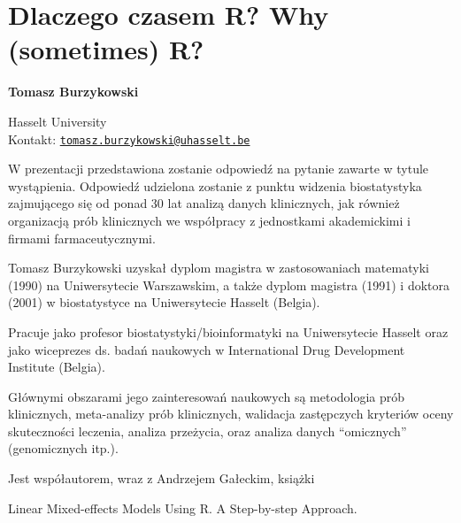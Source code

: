 \documentclass[\main/boa.tex]{subfiles}
\begin{document}
\section{Dlaczego czasem R? Why (sometimes) R?}


\begin{minipage}{0.915\textwidth}
	\centering
  {\bf \LARGE {} Tomasz Burzykowski}
\end{minipage}

\begin{affiliations}
\begin{minipage}{0.915\textwidth}
\centering
\large Hasselt University   \\[1pt]
Kontakt: \href{mailto:tomasz.burzykowski@uhasselt.be}{\nolinkurl{tomasz.burzykowski@uhasselt.be}}\\
\end{minipage}
\end{affiliations}


W prezentacji przedstawiona zostanie odpowiedź na pytanie zawarte w tytule wystąpienia. Odpowiedź udzielona zostanie z punktu widzenia biostatystyka zajmującego się od ponad 30 lat analizą danych klinicznych, jak również organizacją prób klinicznych we współpracy z jednostkami akademickimi i firmami farmaceutycznymi. 

\bio
Tomasz Burzykowski uzyskał dyplom magistra w zastosowaniach matematyki (1990) na Uniwersytecie Warszawskim, a także dyplom magistra (1991) i doktora (2001) w biostatystyce na Uniwersytecie Hasselt (Belgia).

Pracuje jako profesor biostatystyki/bioinformatyki na Uniwersytecie Hasselt oraz jako wiceprezes ds. badań naukowych w International Drug Development Institute (Belgia).

Głównymi obszarami jego zainteresowań naukowych są metodologia prób klinicznych, meta-analizy prób klinicznych, walidacja zastępczych kryteriów oceny skuteczności leczenia, analiza przeżycia, oraz analiza danych “omicznych” (genomicznych itp.).

Jest współautorem, wraz z Andrzejem Gałeckim, książki

Linear Mixed-effects Models Using R. A Step-by-step Approach.
\end{document}
